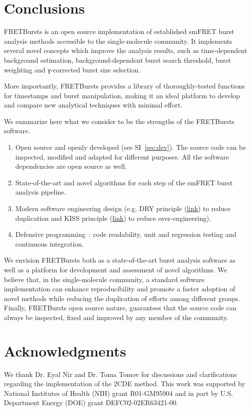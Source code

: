 \section{Conclusions}
\label{sec:conclusions}

FRETBursts is an open source implementation of established smFRET burst analysis methods
accessible to the single-molecule community.
It implements several novel concepts which improve the analysis results, such as
time-dependent background estimation, background-dependent burst search threshold,
burst weighting and γ-corrected burst size selection.

More importantly, FRETBursts provides a library of thoroughly-tested functions
for timestamps and burst manipulation, making it an ideal platform to
develop and compare new analytical techniques with minimal effort.

We summarize here what we consider to be the strengths
of the FRETBursts software.

\begin{enumerate}
\item Open source and openly developed (see SI~\ref{sec:dev}). The source code can be inspected, 
modified and adapted for different purposes. All the software dependencies are open source as well.
\item State-of-the-art and novel algorithms for each step of the
smFRET burst analysis pipeline.
\item Modern software engineering design (e.g. DRY principle
(\href{http://en.wikipedia.org/wiki/Don\%27t_repeat_yourself}{link})
to reduce duplication and KISS principle
(\href{http://en.wikipedia.org/wiki/KISS_principle}{link})
to reduce over-engineering).
\item Defensive programming~\cite{Prli__2012}: code readability,
unit and regression testing and continuous integration.
\end{enumerate}

We envision FRETBursts both as a state-of-the-art burst analysis
software as well as a platform for development and assessment of novel algorithms.
We believe that, in the single-molecule community,
a standard software implementation can enhance
reproducibility and promote a faster adoption of novel methods 
while reducing the duplication of efforts among different groups.
Finally, FRETBursts open source nature, guarantees that the source code
can always be inspected, fixed and improved
by any member of the community.


\section*{Acknowledgments}
We thank Dr. Eyal Nir and Dr. Toma Tomov for discussions and clarifications regarding the 
implementation of the 2CDE method.
This work was supported by National Institutes of Health (NIH)
grant R01-GM95904 and in part by U.S. Department Energy (DOE) grant DEFC02-02ER63421-00.
